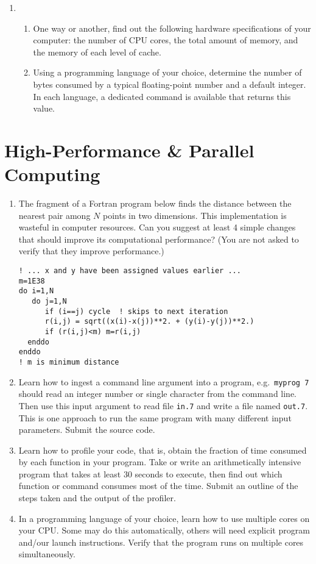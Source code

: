 \documentclass{article}
\begin{document}
\begin{enumerate}
\item
  \begin{enumerate} \setlength{\itemsep}{0pt}
  \item One way or another, find out the following hardware specifications of your computer: the number of CPU cores, the total amount of memory, and the memory of each level of cache.
  \item Using a programming language of your choice, determine the number of bytes consumed by a typical floating-point number and a default integer. In each language, a dedicated command is available that returns this value.
\end{enumerate}
    
\end{enumerate}





\section{High-Performance \& Parallel Computing}
\begin{enumerate}
\item  %

The fragment of a Fortran program below finds the distance between the nearest pair among $N$ points in two dimensions.  This implementation is wasteful in computer resources.
Can you suggest at least 4 simple changes that should improve its computational performance?
(You are not asked to verify that they improve performance.)
\begin{verbatim}
! ... x and y have been assigned values earlier ...
m=1E38
do i=1,N
   do j=1,N
      if (i==j) cycle  ! skips to next iteration
      r(i,j) = sqrt((x(i)-x(j))**2. + (y(i)-y(j))**2.)
      if (r(i,j)<m) m=r(i,j)
  enddo
enddo
! m is minimum distance
\end{verbatim}


\item
Learn how to ingest a command line argument into a program, e.g.\ {\tt myprog 7} should read an integer number or single character from the command line. Then use this input argument to read file {\tt in.7} and write a file named {\tt out.7}.
This is one approach to run the same program with many different input parameters.
Submit the source code.

\item Learn how to profile your code, that is, obtain the fraction of time consumed by each function in your program. Take or write an arithmetically intensive program that takes at least 30 seconds to execute, then find out which function or command consumes most of the time.
Submit an outline of the steps taken and the output of the profiler.
  
\item
  In a programming language of your choice, learn how to use multiple cores on your CPU. Some may do this automatically, others will need explicit program and/our launch instructions.  Verify that the program runs on multiple cores simultaneously.
  
\end{enumerate}
\end{document}
